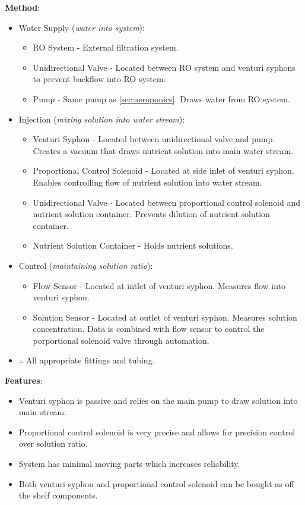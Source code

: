 \documentclass{report}
\begin{document}
\textbf{Method}:
\begin{itemize}
    \item Water Supply (\textit{water into system}):
    \begin{itemize}
        \item RO System - External filtration system. 
        \item Unidirectional Valve - Located between RO system and venturi syphons to prevent backflow into RO system.
        \item Pump - Same pump as \ref{sec:aeroponics}. Draws water from RO system.
    \end{itemize}
    \item Injection (\textit{mixing solution into water stream}):
    \begin{itemize}
        \item Venturi Syphon - Located between unidirectional valve and pump. Creates a vacuum that draws nutrient solution into main water stream.
        \item Proportional Control Solenoid - Located at side inlet of venturi syphon. Enables controlling flow of nutrient solution into water stream.
        \item Unidirectional Valve - Located between proportional control solenoid and nutrient solution container. Prevents dilution of nutrient solution container.
        \item Nutrient Solution Container - Holds nutrient solutions.
    \end{itemize}
    \item Control (\textit{maintaining solution ratio}):
    \begin{itemize}
        \item Flow Sensor - Located at intlet of venturi syphon. Measures flow into venturi syphon.
        \item Solution Sensor - Located at outlet of venturi syphon. Measures solution concentration. Data is combined with flow sensor to control the porportional solenoid valve through automation.
    \end{itemize}
    \item $\therefore$ All appropriate fittings and tubing.
\end{itemize}

\textbf{Features}:
\begin{itemize}
    \item Venturi syphon is passive and relies on the main pump to draw solution into main stream.
    \item Proportional control solenoid is very precise and allows for precision control over solution ratio.
    \item System has minimal moving parts which increases reliability.
    \item Both venturi syphon and proportional control solenoid can be bought as off the shelf components.
\end{itemize}
\end{document}
